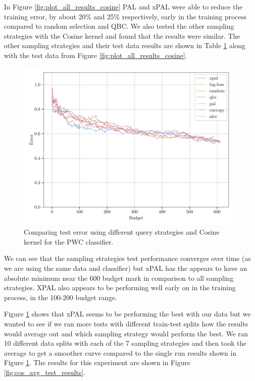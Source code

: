 In Figure \ref{fig:plot_all_results_cosine} PAL and xPAL were able to reduce the training error, by about 20\% and 25\% respectively, early in the training process compared to random selection and QBC. We also tested the other sampling strategies with the Cosine kernel and found that the results were similar. The other sampling strategies and their test data results are shown in Table \ref{fig:cos_test_results} along with the test data from Figure \ref{fig:plot_all_results_cosine}. 


\begin{figure}[ht]
    \centering
    \includegraphics[width=\textwidth]{../img/plot_kernel_cos_test_results.pdf}
    \caption{Comparing test error using different query strategies and Cosine kernel for the PWC classifier.}
    \label{fig:cos_test_results}
\end{figure}

We can see that the sampling strategies test performance converges over time (as we are using the same data and classifier) but xPAL has the appears to have an absolute minimum near the 600 budget mark in comparison to all sampling strategies. XPAL also appears to be performing well early on in the training process, in the 100-200 budget range.

Figure \ref{fig:cos_test_results} shows that xPAL seems to be performing the best with our data but we wanted to see if we ran more tests with different train-test splits how the results would average out and which sampling strategy would perform the best. We ran 10 different data splits with each of the 7 sampling strategies and then took the average to get a smoother curve compared to the single run results shown in Figure \ref*{fig:cos_test_results}. The results for this experiment are shown in Figure \ref{fig:cos_avg_test_results}.

